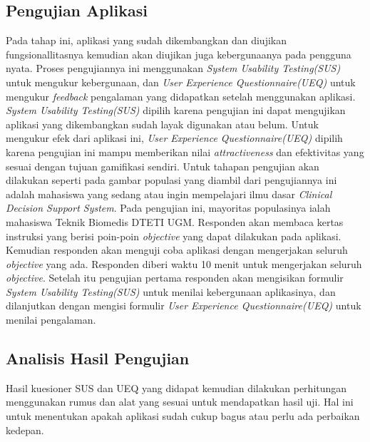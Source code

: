 \subsection{Pengujian Aplikasi}
Pada tahap ini, aplikasi yang sudah dikembangkan dan diujikan fungsionallitasnya kemudian akan diujikan juga kebergunaanya pada pengguna nyata.
Proses pengujiannya ini menggunakan \textit{System Usability Testing(SUS)} untuk mengukur kebergunaan, dan \textit{User Experience Questionnaire(UEQ)} untuk mengukur \textit{feedback} pengalaman yang didapatkan setelah menggunakan aplikasi.
\textit{System Usability Testing(SUS)} dipilih karena pengujian ini dapat mengujikan aplikasi yang dikembangkan sudah layak digunakan atau belum.
Untuk mengukur efek dari aplikasi ini, \textit{User Experience Questionnaire(UEQ)} dipilih karena pengujian ini mampu memberikan nilai \textit{attractiveness} dan efektivitas yang sesuai dengan tujuan gamifikasi sendiri. 
Untuk tahapan pengujian akan dilakukan seperti pada gambar 
populasi yang diambil dari pengujiannya ini adalah mahasiswa yang sedang atau ingin mempelajari ilmu dasar \textit{Clinical Decision Support System}.
Pada pengujian ini, mayoritas populasinya ialah mahasiswa Teknik Biomedis DTETI UGM.
Responden akan membaca kertas instruksi yang berisi poin-poin \textit{objective} yang dapat dilakukan pada aplikasi.
Kemudian responden akan menguji coba aplikasi dengan mengerjakan seluruh \textit{objective} yang ada. Responden diberi waktu 10 menit untuk mengerjakan seluruh \textit{objective}.
Setelah itu pengujian pertama responden akan mengisikan formulir \textit{System Usability Testing(SUS)} untuk menilai kebergunaan aplikasinya, dan dilanjutkan dengan mengisi formulir \textit{User Experience Questionnaire(UEQ)} untuk menilai pengalaman.
\subsection{Analisis Hasil Pengujian}
Hasil kuesioner SUS dan UEQ yang didapat kemudian dilakukan 
perhitungan menggunakan rumus dan alat yang sesuai untuk mendapatkan hasil 
uji. Hal ini untuk menentukan apakah aplikasi sudah cukup bagus atau perlu ada 
perbaikan kedepan.
